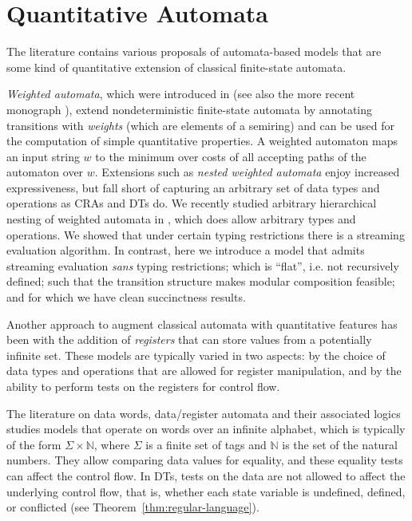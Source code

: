 
\section{Quantitative Automata}

The literature contains various proposals of automata-based models that are some kind of quantitative extension of classical finite-state automata.

\emph{Weighted automata}, which were introduced in \cite{S1961WA} (see also the more recent monograph \cite{DKV2009HWA}), extend nondeterministic finite-state automata by annotating transitions with \emph{weights} (which are elements of a semiring) and can be used for the computation of simple quantitative properties. A weighted automaton maps an input string $w$ to the minimum over costs of all accepting paths of the automaton over $w$.
Extensions such as \emph{nested weighted automata} \cite{CHO2015NWA} enjoy increased expressiveness, but fall short of capturing an arbitrary set of data types and operations as CRAs and DTs do. We recently studied arbitrary hierarchical nesting of weighted automata in \cite{AMS2017SA}, which does allow arbitrary types and operations. We showed that under certain typing restrictions there is a streaming evaluation algorithm. In contrast, here we introduce a model that admits streaming evaluation \emph{sans} typing restrictions; which is ``flat'', i.e. not recursively defined; such that the transition structure makes modular composition feasible; and for which we have clean succinctness results.

Another approach to augment classical automata with quantitative features has been with the addition of \emph{registers} that can store values from a potentially infinite set. These models are typically varied in two aspects: by the choice of data types and operations that are allowed for register manipulation, and by the ability to perform tests on the registers for control flow.

The literature on data words, data/register automata and their associated logics \cite{KF1994FMA, NSV2004FSM, DL2009LFQ, BS2010NRDL, BDMSS2011LDW} studies models that operate on words over an infinite alphabet, which is typically of the form $\Sigma \times \mathbb{N}$, where $\Sigma$ is a finite set of tags and $\mathbb{N}$ is the set of the natural numbers. They allow comparing data values for equality, and these equality tests can affect the control flow.
In DTs, tests on the data are not allowed to affect the underlying control flow, that is, whether each state variable is undefined, defined, or conflicted (see Theorem~\ref{thm:regular-language}).

